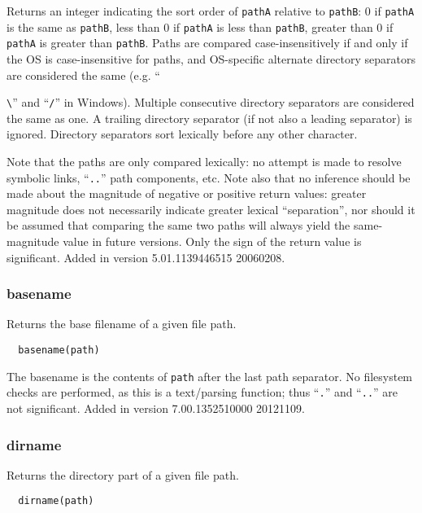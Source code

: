 Returns an integer indicating the sort order of \verb`pathA` relative
to \verb`pathB`: 0 if \verb`pathA` is the same as \verb`pathB`, less
than 0 if \verb`pathA` is less than \verb`pathB`, greater than 0 if
\verb`pathA` is greater than \verb`pathB`.  Paths are compared
case-insensitively if and only if the OS is case-insensitive for
paths, and OS-specific alternate directory separators are considered
the same (e.g. ``{\verb`\`'' and ``\verb`/`'' in Windows).  Multiple
consecutive directory separators are considered the same as one.  A
trailing directory separator (if not also a leading separator) is
ignored.  Directory separators sort lexically before any other
character.

  Note that the paths are only compared lexically: no attempt is made
to resolve symbolic links, ``{\tt ..}'' path components, etc.  Note
also that no inference should be made about the magnitude of negative
or positive return values: greater magnitude does not necessarily
indicate greater lexical ``separation'', nor should it be assumed that
comparing the same two paths will always yield the same-magnitude
value in future versions.  Only the sign of the return value is
significant.  Added in version 5.01.1139446515 20060208.

\subsubsection{basename}

  Returns the base filename of a given file path.

\begin{verbatim}
  basename(path)
\end{verbatim}

The basename is the contents of \verb`path` after the last path separator.
No filesystem checks are performed, as this is a text/parsing function;
thus ``\verb`.`'' and ``\verb`..`'' are not significant.
Added in version 7.00.1352510000 20121109.

\subsubsection{dirname}

  Returns the directory part of a given file path.

\begin{verbatim}
  dirname(path)
\end{verbatim}

}
